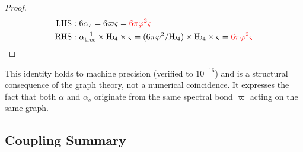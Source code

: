 \documentclass[11pt,a4paper]{article}
\theoremstyle{definition}
\newcommand{\Hb}{\textnormal{H\kern-0.3em b}}
\newcommand{\Hbfour}{\Hb_4}
\newcommand{\strain}{\varsigma}
\newcommand{\specbond}{\varpi}
\begin{document}
\begin{proof}
\begin{align}
\mathrm{LHS:\ } & 6\alpha_s = 6\specbond\strain = \color{red} 6\pi\varphi^2\strain \\
\mathrm{RHS:\ } & \alpha^{-1}_{\mathrm{tree}} \times \Hbfour \times \strain = (6\pi\varphi^2/\Hbfour) \times \Hbfour \times \strain = \color{red} 6\pi\varphi^2\strain 
\end{align}
\end{proof}

This identity holds to machine precision (verified to $10^{-16}$) and is a structural consequence of the graph theory, not a numerical coincidence. It expresses the fact that both $\alpha$ and $\alpha_s$ originate from the same spectral bond $\specbond$ acting on the same graph.

\subsection{Coupling Summary}
\end{document}
